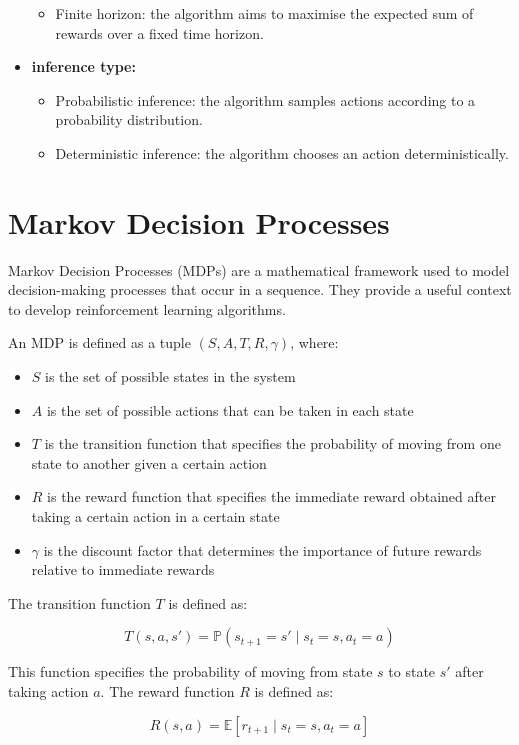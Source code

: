 \begin{minipage}{\textwidth}
\begin{itemize}
\begin{itemize}
    \item Finite horizon: the algorithm aims to maximise the expected sum of rewards over a fixed time horizon.
    \end{itemize}
    \item \textbf{inference type:}
    \begin{itemize}
    \item Probabilistic inference: the algorithm samples actions according to a probability distribution.
    \item Deterministic inference: the algorithm chooses an action deterministically.
    \end{itemize}
    \end{itemize}
\end{minipage}

\section{Markov Decision Processes}
Markov Decision Processes (MDPs) are a mathematical framework used to model decision-making processes that occur in a sequence. They provide a useful 
context to develop reinforcement learning algorithms.

An MDP is defined as a tuple $(S, A, T, R, \gamma)$, where:
\begin{itemize}
    \item $S$ is the set of possible states in the system
    \item $A$ is the set of possible actions that can be taken in each state
    \item $T$ is the transition function that specifies the probability of moving from one state to another given a certain action
    \item $R$ is the reward function that specifies the immediate reward obtained after taking a certain action in a certain state
    \item $\gamma$ is the discount factor that determines the importance of future rewards relative to immediate rewards
\end{itemize}

The transition function $T$ is defined as:

$$T(s, a, s') = \mathbb{P}(s_{t+1}=s' \mid s_t=s, a_t=a)$$

This function specifies the probability of moving from state $s$ to state $s'$ after taking action $a$. The reward function $R$ is defined as:

$$R(s, a) = \mathbb{E}[r_{t+1} \mid s_t=s, a_t=a]$$

